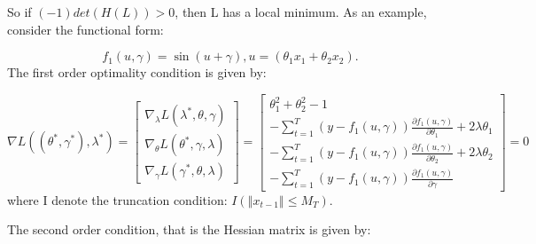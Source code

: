 \documentclass[a4paper,12pt,times,numbered,print,index]{report}
\numberwithin{equation}{section}
\begin{document}
	So if $(-1) det(H(L)) >0$, then L has a local minimum. As an example, consider the functional form:
	
	$$
	f_{1}\left( u,\gamma\right) =\sin \left( u+\gamma\right), u = (\theta_1 x_1 + \theta_2 x_2).
	$$
	The first order optimality condition is given by:
	
	\begin{equation*}
		\nabla L((\theta^{*},\gamma^{*}), \lambda^{*})=\left[\begin{array}{c}
			\nabla_{\lambda} L(\lambda^{*}, \theta, \gamma) \\
			\nabla_{\theta} L(\theta^{*}, \gamma, \lambda) \\
			\nabla_{\gamma} L(\gamma^{*}, \theta, \lambda) 
		\end{array}\right]
		= 
		\left[\begin{array}{c}
			\theta_1^{2} + \theta_2^{2} -1 \\
			-\sum_{t=1}^{T} (y - f_{1}\left( u,\gamma\right))\frac{\partial f_{1}\left( u,\gamma\right)}{\partial \theta_1} + 2\lambda \theta_1\\
			-\sum_{t=1}^{T} (y - f_{1}\left( u,\gamma\right))\frac{\partial f_{1}\left( u,\gamma\right)}{\partial \theta_2} + 2\lambda \theta_2\\
			-\sum_{t=1}^{T} (y - f_{1}\left( u,\gamma\right))\frac{\partial f_{1}\left( u,\gamma\right)}{\partial \gamma}
		\end{array}\right]
		= 0
		\label{gradient cal}
	\end{equation*} 
	where I denote the truncation condition: $I\left( \left\Vert x_{t-1}\right\Vert \leq M_{T}\right)$.
	
	The second order condition, that is the Hessian matrix is given by:
	
\end{document}
